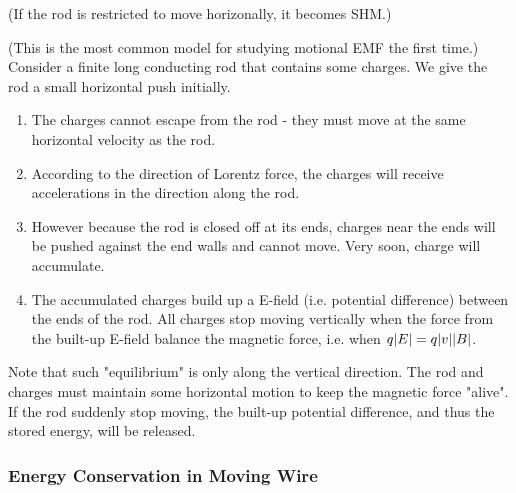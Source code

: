 \documentclass[class=article, crop=false, 12pt]{standalone}
\begin{document}
(If the rod is restricted to move horizonally, it becomes SHM.)


\fi

{\scriptsize (This is the most common model for studying motional EMF the first time.)}\\

Consider a finite long conducting rod that contains some charges. 
We give the rod a small horizontal push initially.
\begin{enumerate}
    \item The charges cannot escape from the rod - 
    they must move at the same horizontal velocity as the rod.

    \item According to the direction of Lorentz force, 
    the charges will receive accelerations in the direction along the rod.

    \item However because the rod is closed off at its ends, 
    charges near the ends will be pushed against the end walls and cannot move.
    Very soon, charge will accumulate.

    \item The accumulated charges build up a E-field (i.e. potential difference) between the ends of the rod. 
    All charges stop moving vertically when the force from the built-up E-field balance the magnetic force, 
    i.e. when $q|E| = q|v||B|$.
\end{enumerate}


Note that such "equilibrium" is only along the vertical direction. 
The rod and charges must maintain some horizontal motion to keep the magnetic force "alive".
If the rod suddenly stop moving,  
the built-up potential difference, and thus the stored energy, will be released.
\begin{center}
\end{center}


\subsubsection{Energy Conservation in Moving Wire}
\end{document}
